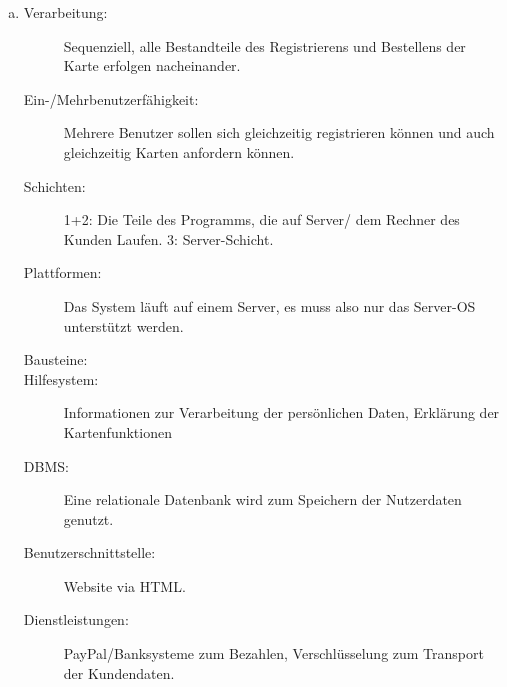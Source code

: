 \begin{enumerate} [a)]
\begin{description}
		\item [Benutzerschnittstelle:] GUI der App.
		\item[Dienstleistungen:] Maps, um Die Pizzeria zu finden.
	\end{description}
	\item 
		\begin{description}
		\item[Verarbeitung:] Sequenziell, alle Bestandteile des Registrierens und Bestellens der Karte erfolgen nacheinander.
		\item[Ein-/Mehrbenutzerfähigkeit:] Mehrere Benutzer sollen sich gleichzeitig registrieren können und auch gleichzeitig Karten anfordern können.
		\item[Schichten:] 1+2: Die Teile des Programms, die auf Server/ dem Rechner des Kunden Laufen. 3: Server-Schicht.
		\item[Plattformen:] Das System läuft auf einem Server, es muss also nur das Server-OS unterstützt werden.
		\item[Bausteine:]
		\item[Hilfesystem:] Informationen zur Verarbeitung der persönlichen Daten, Erklärung der Kartenfunktionen
		\item[DBMS:] Eine relationale Datenbank wird zum Speichern der Nutzerdaten genutzt.
		\item[Benutzerschnittstelle:] Website via HTML.
		\item[Dienstleistungen:] PayPal/Banksysteme zum Bezahlen, Verschlüsselung zum Transport der Kundendaten.
	\end{description}
	
\end{enumerate}
